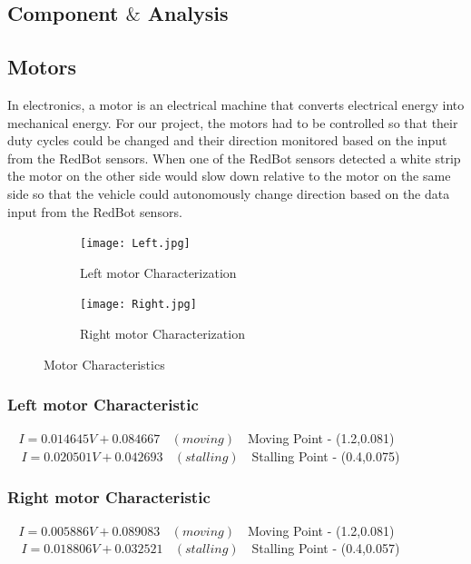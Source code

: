 \documentclass[12pt,a4paper]{article}
\begin{document}
\begin{large}
\section{Component $\&$ Analysis}


\subsection{Motors}

In electronics, a motor is an electrical machine that converts electrical energy into mechanical energy. For our project, the motors had to be controlled so that their duty cycles could be changed and their direction monitored based on the input from the RedBot sensors. When one of the RedBot sensors detected a white strip the motor on the other side would slow down relative to the motor on the same side so that the vehicle could autonomously change direction based on the data input from the RedBot sensors. 

\begin{figure} [hbp]
\centering
  \begin{subfigure}[b]{0.4\textwidth}
    \texttt{[image: Left.jpg]}
    \caption{Left motor Characterization}
    \label{fig:f1}
  \end{subfigure}
  \hspace{1cm}
  \begin{subfigure}[b]{0.4\textwidth}
    \texttt{[image: Right.jpg]}
    \caption{Right motor Characterization}
    \label{fig:f2}
  \end{subfigure}
  \caption{Motor Characteristics}
\end{figure}

\subsubsection{Left motor Characteristic}

$~~~~I=0.014645V+0.084667 ~~~~(moving)~~~$   Moving Point - (1.2,0.081)\\
$~~~~~I=0.020501V+0.042693 ~~~~(stalling)~~~$  Stalling Point - (0.4,0.075)
\subsubsection{Right motor Characteristic}

$~~~~I=0.005886V+0.089083 ~~~~(moving)~~~$   Moving Point - (1.2,0.081)\\
$~~~~~I=0.018806V+0.032521 ~~~~(stalling)~~~$  Stalling Point - (0.4,0.057)\\



\end{large}
\end{document}
